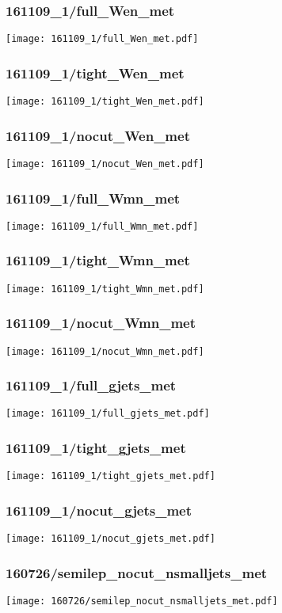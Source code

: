 \begin{frame}
   \frametitle{\small 161109\_1/full\_Wen\_met}
   \centering
   \texttt{[image: 161109\_1/full\_Wen\_met.pdf]}
\end{frame}

\begin{frame}
   \frametitle{\small 161109\_1/tight\_Wen\_met}
   \centering
   \texttt{[image: 161109\_1/tight\_Wen\_met.pdf]}
\end{frame}

\begin{frame}
   \frametitle{\small 161109\_1/nocut\_Wen\_met}
   \centering
   \texttt{[image: 161109\_1/nocut\_Wen\_met.pdf]}
\end{frame}

\begin{frame}
   \frametitle{\small 161109\_1/full\_Wmn\_met}
   \centering
   \texttt{[image: 161109\_1/full\_Wmn\_met.pdf]}
\end{frame}

\begin{frame}
   \frametitle{\small 161109\_1/tight\_Wmn\_met}
   \centering
   \texttt{[image: 161109\_1/tight\_Wmn\_met.pdf]}
\end{frame}

\begin{frame}
   \frametitle{\small 161109\_1/nocut\_Wmn\_met}
   \centering
   \texttt{[image: 161109\_1/nocut\_Wmn\_met.pdf]}
\end{frame}

\begin{frame}
   \frametitle{\small 161109\_1/full\_gjets\_met}
   \centering
   \texttt{[image: 161109\_1/full\_gjets\_met.pdf]}
\end{frame}

\begin{frame}
   \frametitle{\small 161109\_1/tight\_gjets\_met}
   \centering
   \texttt{[image: 161109\_1/tight\_gjets\_met.pdf]}
\end{frame}

\begin{frame}
   \frametitle{\small 161109\_1/nocut\_gjets\_met}
   \centering
   \texttt{[image: 161109\_1/nocut\_gjets\_met.pdf]}
\end{frame}

\begin{frame}
   \frametitle{\small 160726/semilep\_nocut\_nsmalljets\_met}
   \centering
   \texttt{[image: 160726/semilep\_nocut\_nsmalljets\_met.pdf]}
\end{frame}


